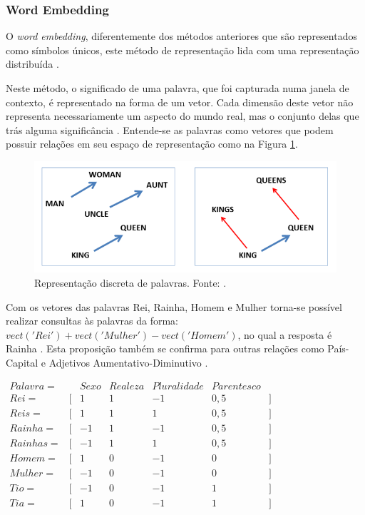 \subsubsection{Word Embedding}

O \textit{word embedding}, diferentemente dos métodos anteriores que são representados como símbolos únicos, este método de representação lida com uma representação distribuída \cite{GOLDBERG2017}.

Neste método, o significado de uma palavra, que foi capturada numa janela de contexto, é representado na forma de um vetor. Cada dimensão deste vetor não representa necessariamente um aspecto do mundo real, mas o conjunto delas que trás alguma significância \cite{GOLDBERG2017}. Entende-se as palavras como vetores que podem possuir relações em seu espaço de representação como na Figura \ref{fig:wordtovec}. 

\begin{figure}[h]
	\centering
	\includegraphics[keepaspectratio=true,scale=0.5]{figuras/wordtovec}
    \caption{Representação discreta de palavras. Fonte: \cite[Página 479]{MIKOLOV2013b}.}
    \label{fig:wordtovec}
\end{figure}
Com os vetores das palavras Rei, Rainha, Homem e Mulher torna-se possível realizar consultas às palavras da forma: $vect('Rei') + vect('Mulher') - vect('Homem')$, no qual a resposta é Rainha \cite{MIKOLOV2013b}. Esta proposição também se confirma para outras relações como País-Capital e Adjetivos Aumentativo-Diminutivo \cite{MIKOLOV2013a}.

\begin{center}
    $
    \begin{array}{rlrrrrr}
        \label{ex:we}
        Palavra = &  & Sexo & Realeza & Pluralidade & Parentesco \\ \hline
        Rei = & [ & 1 & 1 & -1 & 0,5 & ]  \\
		Reis = & [ & 1 & 1 & 1 & 0,5 & ]  \\
        Rainha = & [ & -1 & 1 & -1 & 0,5 & ] \\
        Rainhas = & [ & -1 & 1 & 1 & 0,5 & ] \\
        Homem = & [ & 1 & 0 & -1 & 0 & ] \\
        Mulher = & [ & -1 & 0 & -1 & 0 & ] \\
        Tio = & [ & -1 & 0 & -1 & 1 & ] \\
        Tia = & [ & 1 & 0 & -1 & 1 & ] \\
    \end{array}
  	$
\end{center}


